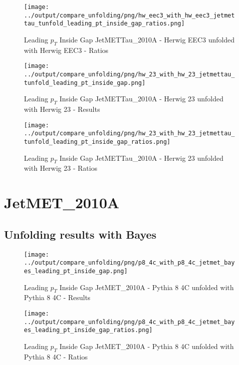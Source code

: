 \documentclass[11pt]{book}
\begin{document}
\begin{figure}[ht]
\centering
\texttt{[image: ../output/compare\_unfolding/png/hw\_eec3\_with\_hw\_eec3\_jetmettau\_tunfold\_leading\_pt\_inside\_gap\_ratios.png]}
\caption{Leading $p_{T}$ Inside Gap JetMETTau\_2010A - Herwig EEC3 unfolded with Herwig EEC3 - Ratios}
\label{hw_eec3_hw_eec3_jetmettau_tunfold_leading_pt_inside_gap_b}
\end{figure}

\begin{figure}[ht]
\centering
\texttt{[image: ../output/compare\_unfolding/png/hw\_23\_with\_hw\_23\_jetmettau\_tunfold\_leading\_pt\_inside\_gap.png]}
\caption{Leading $p_{T}$ Inside Gap JetMETTau\_2010A - Herwig 23 unfolded with Herwig 23 - Results}
\label{hw_23_hw_23_jetmettau_tunfold_leading_pt_inside_gap_a}
\end{figure}

\begin{figure}[ht]
\centering
\texttt{[image: ../output/compare\_unfolding/png/hw\_23\_with\_hw\_23\_jetmettau\_tunfold\_leading\_pt\_inside\_gap\_ratios.png]}
\caption{Leading $p_{T}$ Inside Gap JetMETTau\_2010A - Herwig 23 unfolded with Herwig 23 - Ratios}
\label{hw_23_hw_23_jetmettau_tunfold_leading_pt_inside_gap_b}
\end{figure}


\clearpage
\section{JetMET\_2010A}
\subsection{Unfolding results with Bayes}

\begin{figure}[ht]
\centering
\texttt{[image: ../output/compare\_unfolding/png/p8\_4c\_with\_p8\_4c\_jetmet\_bayes\_leading\_pt\_inside\_gap.png]}
\caption{Leading $p_{T}$ Inside Gap JetMET\_2010A - Pythia 8 4C unfolded with Pythia 8 4C - Results}
\label{p8_p8_jetmet_bayes_leading_pt_inside_gap_a}
\end{figure}

\begin{figure}[ht]
\centering
\texttt{[image: ../output/compare\_unfolding/png/p8\_4c\_with\_p8\_4c\_jetmet\_bayes\_leading\_pt\_inside\_gap\_ratios.png]}
\caption{Leading $p_{T}$ Inside Gap JetMET\_2010A - Pythia 8 4C unfolded with Pythia 8 4C - Ratios}
\label{p8_p8_jetmet_bayes_leading_pt_inside_gap_b}
\end{figure}
\end{document}
